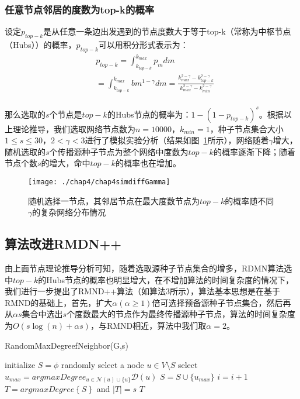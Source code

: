 \subsubsection{任意节点邻居的度数为top-k的概率}
设定$p_{top-k}$是从任意一条边出发遇到的节点度数大于等于top-k（常称为中枢节点（Hubs））的概率，$p_{top-k}$可以用积分形式表示为：
\begin{equation}
\label{equ:chap4:equ11}
	\begin{split}
	& p_{top-k}=\int_{k_{top-k}}^{k_{max}}p_mdm \\
	& =\int_{k_{top-k}}^{k_{max}}bm^{1-\gamma}dm=\frac{k_{max}^{2-\gamma}-k_{top-k}^{2-\gamma}}{k_{max}^{2-\gamma}-k_{min}^{2-\gamma}}\\
	\end{split}
\end{equation}

那么选取的$s$个节点是$top-k$的Hubs节点的概率为：$1-(1-p_{top-k})^{s}$。根据以上理论推导，我们选取网络节点数为$n=10000$，$k_{min}=1$，种子节点集合大小$1\le s \le 30$，$2<\gamma <3$进行了模拟实验分析（结果如图~\ref{fig:chap4simdiffGamma}所示），网络随着$\gamma$增大，随机选取的$s$个传播源种子节点为整个网络中度数为$top-k$的概率逐渐下降；随着节点个数$s$的增大，命中$top-k$的概率也在增加。
\begin{figure}[H]
	\centering
	\texttt{[image: ./chap4/chap4simdiffGamma]}
	\caption{随机选择一节点，其邻居节点在最大度数节点为$top-k$的概率随不同$\gamma$的复杂网络分布情况}
	\label{fig:chap4simdiffGamma}
\end{figure}
\subsection{算法改进RMDN++}
由上面节点理论推导分析可知，随着选取源种子节点集合的增多，RDMN算法选中$top-k$的Hubs节点的概率也明显增大，在不增加算法的时间复杂度的情况下，我们进行一步提出了RMND++算法（如算法3所示），算法基本思想是在基于RMND的基础上，首先，扩大$\alpha (\alpha \geq 1)$倍可选择预备源种子节点集合，然后再从$\alpha s$集合中选出$s$个度数最大的节点作为最终传播源种子节点，算法的时间复杂度为$O(s\log (n)+\alpha s)$，与RMND相近，算法中我们取$\alpha =2$。
\begin{algorithm}
	\caption{RandomMaxDegreefNeighbor(G,s)}
	\label{alg:chap4:RandomMaxDegreefNeighbor++}
	\begin{algorithmic}[1]
		\STATE initialize $S = \phi$
		\STATE randomly select a node $u \in V\setminus S$ 
		\STATE select $u_{max} = argmaxDegree_{u \in \mathcal{N}(u) \cup \{u\}} \mathcal{D}(u)$
		\STATE $S = S \cup \{u_{max}\}$
		\STATE $i = i + 1$
		\ENDWHILE
		\STATE $T=argmaxDegree\left\lbrace S \right\rbrace $ and $|T|=s$
		\RETURN $T$
	\end{algorithmic}
\end{algorithm}
